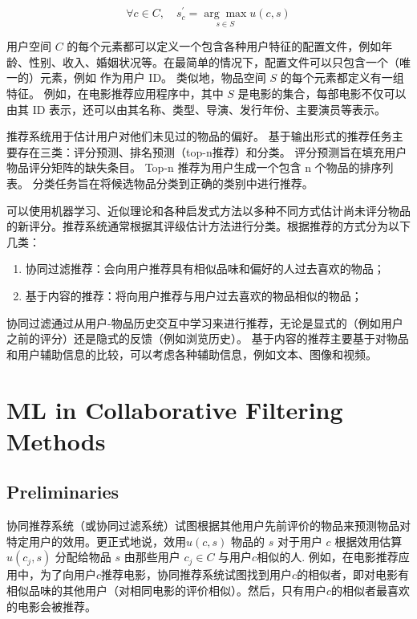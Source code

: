 \documentclass[sigconf]{acmart}
\begin{document}
\begin{equation}
\forall c \in C, \quad s_{c}^{\prime}=\underset{s \in S}{\arg \max } u(c, s)
\end{equation}

用户空间 $C$ 的每个元素都可以定义一个包含各种用户特征的配置文件，例如年龄、性别、收入、婚姻状况等。在最简单的情况下，配置文件可以只包含一个（唯一的）元素，例如 作为用户 ID。 类似地，物品空间 $S$ 的每个元素都定义有一组特征。 例如，在电影推荐应用程序中，其中 $S$ 是电影的集合，每部电影不仅可以由其 ID 表示，还可以由其名称、类型、导演、发行年份、主要演员等表示。

推荐系统用于估计用户对他们未见过的物品的偏好。 基于输出形式的推荐任务主要存在三类：评分预测、排名预测（top-n推荐）和分类。 评分预测旨在填充用户物品评分矩阵的缺失条目。 Top-n 推荐为用户生成一个包含 n 个物品的排序列表。 分类任务旨在将候选物品分类到正确的类别中进行推荐。

可以使用机器学习、近似理论和各种启发式方法以多种不同方式估计尚未评分物品的新评分。推荐系统通常根据其评级估计方法进行分类。根据推荐的方式分为以下几类\cite{balabanovic1997fab}：

\begin{enumerate}
  \item 协同过滤推荐：会向用户推荐具有相似品味和偏好的人过去喜欢的物品；
  \item 基于内容的推荐：将向用户推荐与用户过去喜欢的物品相似的物品；
\end{enumerate}

协同过滤通过从用户-物品历史交互中学习来进行推荐，无论是显式的（例如用户之前的评分）还是隐式的反馈（例如浏览历史）。 基于内容的推荐主要基于对物品和用户辅助信息的比较，可以考虑各种辅助信息，例如文本、图像和视频。

\section{ML in Collaborative Filtering Methods}

\subsection{Preliminaries}

协同推荐系统（或协同过滤系统）试图根据其他用户先前评价的物品来预测物品对特定用户的效用。更正式地说，效用$u(c,s)$ 物品的 $s$ 对于用户 $c$ 根据效用估算 $u(c_j, s)$ 分配给物品 $s$ 由那些用户 $c_j\in C$ 与用户$c$相似的人. 例如，在电影推荐应用中，为了向用户$c$推荐电影，协同推荐系统试图找到用户$c$的相似者，即对电影有相似品味的其他用户（对相同电影的评价相似）。然后，只有用户$c$的相似者最喜欢的电影会被推荐。
\end{document}
